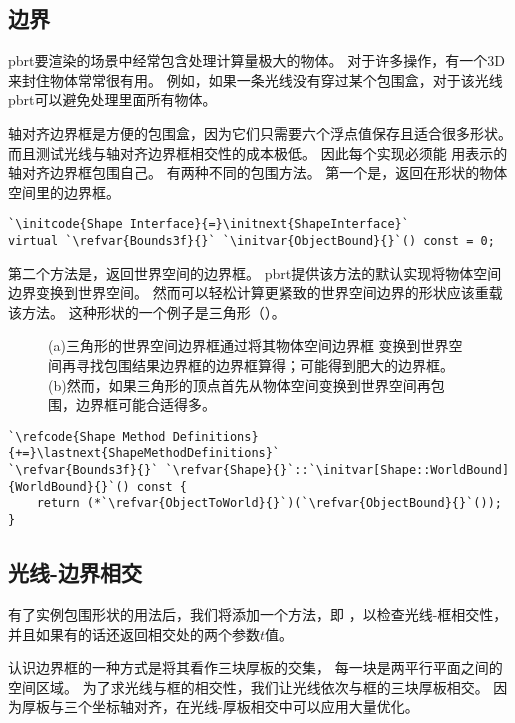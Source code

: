 \subsection{边界}\label{sub:边界}
pbrt要渲染的场景中经常包含处理计算量极大的物体。
对于许多操作，有一个3D来封住物体常常很有用。
例如，如果一条光线没有穿过某个包围盒，对于该光线pbrt可以避免处理里面所有物体。

轴对齐边界框是方便的包围盒，因为它们只需要六个浮点值保存且适合很多形状。
而且测试光线与轴对齐边界框相交性的成本极低。
因此每个实现必须能
用表示的轴对齐边界框包围自己。
有两种不同的包围方法。
第一个是，返回在形状的物体空间里的边界框。
\begin{lstlisting}
`\initcode{Shape Interface}{=}\initnext{ShapeInterface}`
virtual `\refvar{Bounds3f}{}` `\initvar{ObjectBound}{}`() const = 0;
\end{lstlisting}

第二个方法是，返回世界空间的边界框。
pbrt提供该方法的默认实现将物体空间边界变换到世界空间。
然而可以轻松计算更紧致的世界空间边界的形状应该重载该方法。
这种形状的一个例子是三角形（）。
\begin{figure}[htbp]
    \centering
    \caption{(a)三角形的世界空间边界框通过将其物体空间边界框
        变换到世界空间再寻找包围结果边界框的边界框算得；可能得到肥大的边界框。
        (b)然而，如果三角形的顶点首先从物体空间变换到世界空间再包围，边界框可能合适得多。}
    \label{fig:3.1}
\end{figure}

\begin{lstlisting}
`\refcode{Shape Method Definitions}{+=}\lastnext{ShapeMethodDefinitions}`
`\refvar{Bounds3f}{}` `\refvar{Shape}{}`::`\initvar[Shape::WorldBound]{WorldBound}{}`() const {
    return (*`\refvar{ObjectToWorld}{}`)(`\refvar{ObjectBound}{}`());
}
\end{lstlisting}

\subsection{光线-边界相交}\label{sub:光线-边界相交}
有了实例包围形状的用法后，我们将添加一个方法，即
，以检查光线-框相交性，
并且如果有的话还返回相交处的两个参数$t$值。

认识边界框的一种方式是将其看作三块厚板的交集，
每一块是两平行平面之间的空间区域。
为了求光线与框的相交性，我们让光线依次与框的三块厚板相交。
因为厚板与三个坐标轴对齐，在光线-厚板相交中可以应用大量优化。

